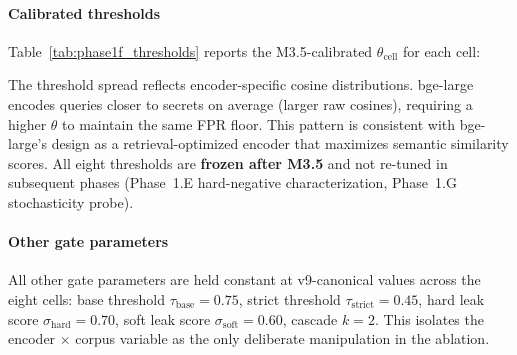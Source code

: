 \documentclass[journal]{IEEEtran}
\begin{document}
\paragraph{Calibrated thresholds}
Table~\ref{tab:phase1f_thresholds} reports the M3.5-calibrated $\theta_{\text{cell}}$ for each cell:

\begin{table}[!t]
    \centering
    \caption{M3.5-calibrated sensitive-threshold $\theta_{\text{cell}}$ per cell.}
    \label{tab:phase1f_thresholds}
\end{table}

The threshold spread reflects encoder-specific cosine distributions. bge-large encodes queries closer to secrets on average (larger raw cosines), requiring a higher $\theta$ to maintain the same FPR floor. This pattern is consistent with bge-large's design as a retrieval-optimized encoder that maximizes semantic similarity scores. All eight thresholds are \textbf{frozen after M3.5} and not re-tuned in subsequent phases (Phase~1.E hard-negative characterization, Phase~1.G stochasticity probe).

\paragraph{Other gate parameters}
All other gate parameters are held constant at v9-canonical values across the eight cells: base threshold $\tau_{\text{base}}{=}0.75$, strict threshold $\tau_{\text{strict}}{=}0.45$, hard leak score $\sigma_{\text{hard}}{=}0.70$, soft leak score $\sigma_{\text{soft}}{=}0.60$, cascade $k{=}2$. This isolates the encoder $\times$ corpus variable as the only deliberate manipulation in the ablation.
\end{document}
